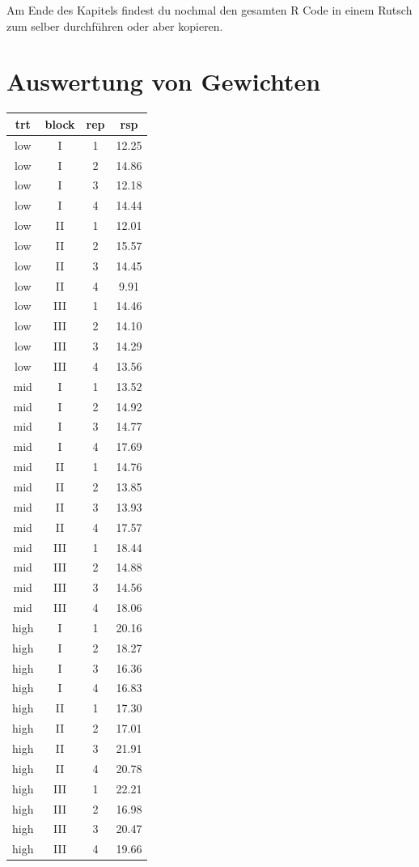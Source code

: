 \documentclass[
  letterpaper,
  DIV=11,
  oneside]{scrreport}
\begin{document}
Am Ende des Kapitels findest du nochmal den gesamten R Code in einem
Rutsch zum selber durchführen oder aber kopieren.

\hypertarget{auswertung-von-gewichten}{%
\section{Auswertung von Gewichten}\label{auswertung-von-gewichten}}

\begin{longtable}[]{@{}cccc@{}}
\toprule()
trt & block & rep & rsp \\
\midrule()
\endhead
low & I & 1 & 12.25 \\
low & I & 2 & 14.86 \\
low & I & 3 & 12.18 \\
low & I & 4 & 14.44 \\
low & II & 1 & 12.01 \\
low & II & 2 & 15.57 \\
low & II & 3 & 14.45 \\
low & II & 4 & 9.91 \\
low & III & 1 & 14.46 \\
low & III & 2 & 14.10 \\
low & III & 3 & 14.29 \\
low & III & 4 & 13.56 \\
mid & I & 1 & 13.52 \\
mid & I & 2 & 14.92 \\
mid & I & 3 & 14.77 \\
mid & I & 4 & 17.69 \\
mid & II & 1 & 14.76 \\
mid & II & 2 & 13.85 \\
mid & II & 3 & 13.93 \\
mid & II & 4 & 17.57 \\
mid & III & 1 & 18.44 \\
mid & III & 2 & 14.88 \\
mid & III & 3 & 14.56 \\
mid & III & 4 & 18.06 \\
high & I & 1 & 20.16 \\
high & I & 2 & 18.27 \\
high & I & 3 & 16.36 \\
high & I & 4 & 16.83 \\
high & II & 1 & 17.30 \\
high & II & 2 & 17.01 \\
high & II & 3 & 21.91 \\
high & II & 4 & 20.78 \\
high & III & 1 & 22.21 \\
high & III & 2 & 16.98 \\
high & III & 3 & 20.47 \\
high & III & 4 & 19.66 \\
\bottomrule()
\end{longtable}
\end{document}
